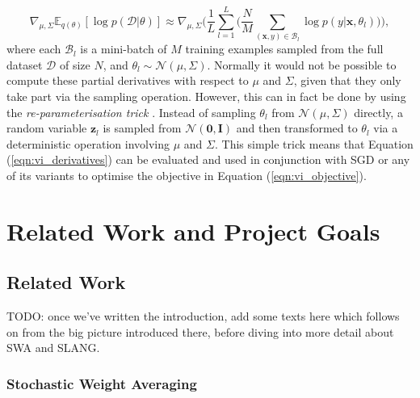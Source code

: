 \documentclass[msc,deptreport.inf]{infthesis} %
\newcommand{\matr}[1]{\mathbf{#1}}
\newcommand{\E}{\mathbb E}
\begin{document}
\begin{equation}\label{eqn:vi_derivatives}
	 \nabla_{\mu, \Sigma} \E_{q(\theta)} [\log p(\mathcal{D} | \theta)]
	\approx \nabla_{\mu, \Sigma} \Bigg(\frac{1}{L}  \sum_{l=1}^{L} \Bigg( \frac{N}{M} \sum_{(\matr{x}, y) \in \mathcal{B}_l} \log p(y | \matr{x}, \theta_l) \Bigg)\Bigg),
\end{equation}
where each $\mathcal{B}_l$ is a mini-batch of $M$ training examples sampled from the full dataset $\mathcal{D}$ of size $N$, and $\theta_l \sim \mathcal{N}(\mu, \Sigma)$. Normally it would not be possible to compute these partial derivatives with respect to $\mu$ and $\Sigma$, given that they only take part via the sampling operation. However, this can in fact be done by using the \emph{re-parameterisation trick} \cite{goodfellow2016}. Instead of sampling $\theta_l$ from $\mathcal{N}(\mu, \Sigma)$ directly, a random variable $\matr{z}_l$ is sampled from $\mathcal{N}(\matr{0}, \matr{I})$ and then transformed to $\theta_l$ via a deterministic operation involving $\mu$ and $\Sigma$. This simple trick means that Equation (\ref{eqn:vi_derivatives}) can be evaluated and used in conjunction with SGD or any of its variants to optimise the objective in Equation (\ref{eqn:vi_objective}).


\chapter{Related Work and Project Goals}\label{ch:previous_work}

\section{Related Work}\label{sec:related_work}

TODO: once we've written the introduction, add some texts here which follows on from the big picture introduced there, before diving into more detail about SWA and SLANG. 

\subsection{Stochastic Weight Averaging}\label{sec:swa}
\end{document}
